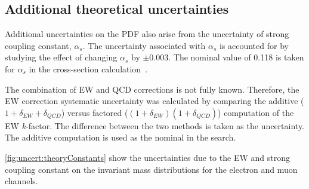 \subsection{Additional theoretical uncertainties}
Additional uncertainties on the PDF also arise from the uncertainty of strong coupling constant, $\alpha_s$. The uncertainty associated with  $\alpha_s$ is accounted for by studying the effect of changing $\alpha_s$ by $\pm 0.003$. The nominal value of 0.118 is taken for $\alpha_s$ in the cross-section calculation~\cite{Butterworth_2016}.

The combination of EW and QCD corrections is not fully known. Therefore, the EW correction systematic uncertainty was calculated by comparing the additive ($1 + \delta_{EW} + \delta_{QCD}$) versus factored ($(1 + \delta_{EW})(1 + \delta_{QCD})$) computation of the EW \emph{k}-factor. The difference between the two methods is taken as the uncertainty. The additive computation is used as the nominal in the search. 

\cref{fig:uncert:theoryConstants} show the uncertainties due to the EW and strong coupling constant on the invariant mass distributions for the electron and muon channels. 

